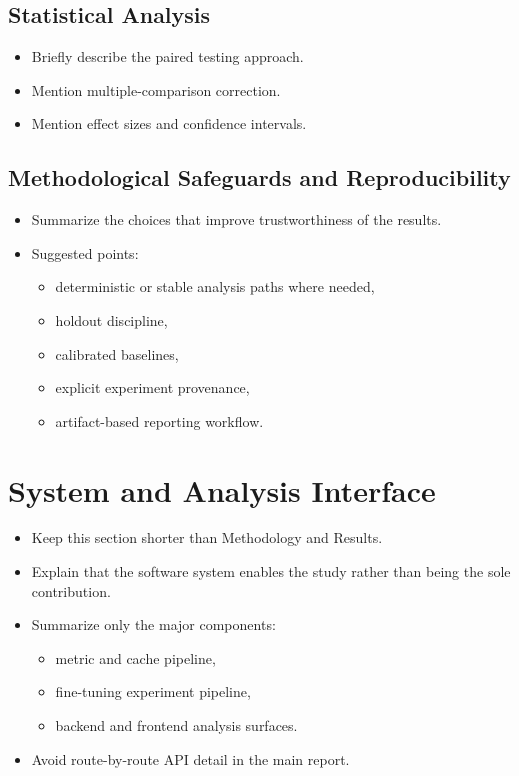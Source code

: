 \documentclass[11pt]{article}
\begin{document}
\subsection{Statistical Analysis}

\begin{itemize}[leftmargin=1.5em]
    \item Briefly describe the paired testing approach.
    \item Mention multiple-comparison correction.
    \item Mention effect sizes and confidence intervals.
\end{itemize}

\subsection{Methodological Safeguards and Reproducibility}

\begin{itemize}[leftmargin=1.5em]
    \item Summarize the choices that improve trustworthiness of the results.
    \item Suggested points:
    \begin{itemize}[leftmargin=1.5em]
        \item deterministic or stable analysis paths where needed,
        \item holdout discipline,
        \item calibrated baselines,
        \item explicit experiment provenance,
        \item artifact-based reporting workflow.
    \end{itemize}
\end{itemize}

\section{System and Analysis Interface}

\begin{itemize}[leftmargin=1.5em]
    \item Keep this section shorter than Methodology and Results.
    \item Explain that the software system enables the study rather than being
    the sole contribution.
    \item Summarize only the major components:
    \begin{itemize}[leftmargin=1.5em]
        \item metric and cache pipeline,
        \item fine-tuning experiment pipeline,
        \item backend and frontend analysis surfaces.
    \end{itemize}
    \item Avoid route-by-route API detail in the main report.
\end{itemize}
\end{document}
